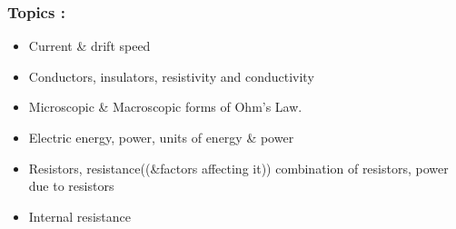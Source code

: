 \documentclass[13pt,addpoints]{exam}
\begin{document}
	\subsubsection*{Topics :}
	\begin{itemize}
		\item Current \& drift speed
		\item Conductors, insulators, resistivity and conductivity
		\item Microscopic \& Macroscopic forms of Ohm's Law.
		\item Electric energy, power, units of energy \& power
		\item Resistors, resistance((\&factors affecting it)) combination of resistors, power due to resistors
		\item Internal resistance
	\end{itemize}
\end{document}
